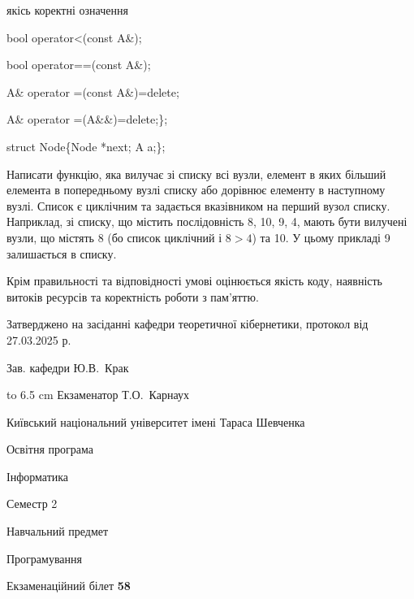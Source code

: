 \documentclass[12pt, ukrainian]{article}
\begin{document}
{\quad  якісь коректні означення 

\quad  bool operator<(const A\&); 

\quad  bool operator==(const A\&); 

\quad A\& operator =(const A\&)=delete; 

\quad  A\& operator =(A\&\&)=delete;\};

struct Node\{Node *next; A a;\};

 Написати функцію, яка вилучає зі списку всі вузли, елемент в яких більший елемента в попередньому вузлі списку або дорівнює елементу в наступному вузлі. Список є циклічним та задається вказівником на перший вузол списку. Наприклад, зі списку, що містить послідовність 8, 10, 9, 4, мають бути вилучені вузли, що містять 8 (бо список циклічний і $8>4$) та 10. У цьому прикладі 9 залишається в списку.

Крім правильності та відповідності умові оцінюється якість коду, наявність витоків ресурсів та коректність роботи з пам'яттю. 

}
{\smallskip\smallskip \begin {scriptsize} Затверджено на засіданні кафедри теоретичної кібернетики, протокол   від   27.03.2025 р.\par\smallskip\smallskip\smallskip\smallskip
{\parbox {6.5 cm} {Зав. кафедри \dotfill Ю.В.~Крак}}\hspace {0.7cm} {\hbox to 6.5 cm { Екзаменатор \dotfill Т.О.~Карнаух}} \end{scriptsize}}
\newpage
{{\begin {scriptsize}\par
{ \center  Київський національний університет імені Тараса Шевченка \par}
{\parbox {5 cm}{Освітня програма \hfill}{\parbox {7 cm}{Інформатика\hfill}}\parbox {6 cm}{\hfill Семестр 2}}\par
{\parbox {5 cm} {Навчальний предмет \hfill}\parbox {7 cm}{Програмування \hfill}\parbox {6cm}{\hfill}\par}\vspace{-15pt} \end{scriptsize}}{\center Екзаменаційний білет \No \textbf { 58 }\par}}
\end{document}
